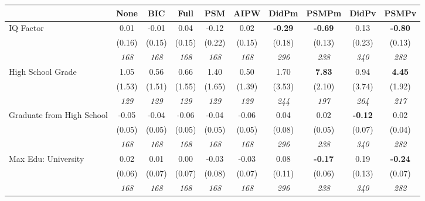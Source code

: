 \begin{tabular}{l c c c c c c c c c}
\toprule
 & None & BIC & Full & PSM & AIPW & DidPm & PSMPm & DidPv & PSMPv \\
\midrule
IQ Factor & 0.01 & -0.01 & 0.04 & -0.12 & 0.02 & \textbf{ -0.29 } & \textbf{-0.69} & 0.13 & \textbf{-0.80} \\
& (0.16) & (0.15) & (0.15) & (0.22) & (0.15) & (0.18) & (0.13) & (0.23) & (0.13) \\
& \textit{ 168 } & \textit{ 168 } & \textit{ 168 } & \textit{ 168 } & \textit{ 168 } & \textit{ 296 } & \textit{ 238 } & \textit{ 340 } & \textit{ 282 } \\
High School Grade & 1.05 & 0.56 & 0.66 & 1.40 & 0.50 & 1.70 & \textbf{7.83} & 0.94 & \textbf{4.45} \\
& (1.53) & (1.51) & (1.55) & (1.65) & (1.39) & (3.53) & (2.10) & (3.74) & (1.92) \\
& \textit{ 129 } & \textit{ 129 } & \textit{ 129 } & \textit{ 129 } & \textit{ 129 } & \textit{ 244 } & \textit{ 197 } & \textit{ 264 } & \textit{ 217 } \\
Graduate from High School & -0.05 & -0.04 & -0.06 & -0.04 & -0.06 & 0.04 & 0.02 & \textbf{ -0.12 } & 0.02 \\
& (0.05) & (0.05) & (0.05) & (0.05) & (0.05) & (0.08) & (0.05) & (0.07) & (0.04) \\
& \textit{ 168 } & \textit{ 168 } & \textit{ 168 } & \textit{ 168 } & \textit{ 168 } & \textit{ 296 } & \textit{ 238 } & \textit{ 340 } & \textit{ 282 } \\
Max Edu: University & 0.02 & 0.01 & 0.00 & -0.03 & -0.03 & 0.08 & \textbf{-0.17} & 0.19 & \textbf{-0.24} \\
& (0.06) & (0.07) & (0.07) & (0.08) & (0.07) & (0.11) & (0.06) & (0.13) & (0.07) \\
& \textit{ 168 } & \textit{ 168 } & \textit{ 168 } & \textit{ 168 } & \textit{ 168 } & \textit{ 296 } & \textit{ 238 } & \textit{ 340 } & \textit{ 282 } \\
\bottomrule
\end{tabular}
